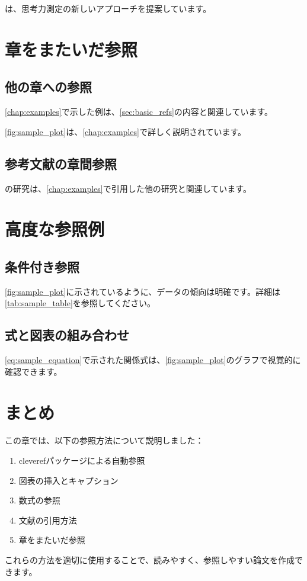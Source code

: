\documentclass[../main/main.tex]{subfiles}
\begin{document}
\parencite{arai2020japanese}は、思考力測定の新しいアプローチを提案しています。

\section{章をまたいだ参照}

\subsection{他の章への参照}

\cref{chap:examples}で示した例は、\cref{sec:basic_refs}の内容と関連しています。

\cref{fig:sample_plot}は、\cref{chap:examples}で詳しく説明されています。

\subsection{参考文献の章間参照}

\textcite{arai2020japanese}の研究は、\cref{chap:examples}で引用した他の研究\parencite{Black1998-yt}と関連しています。

\section{高度な参照例}

\subsection{条件付き参照}

\cref{fig:sample_plot}に示されているように、データの傾向は明確です。詳細は\cref{tab:sample_table}を参照してください。

\subsection{式と図表の組み合わせ}

\cref{eq:sample_equation}で示された関係式は、\cref{fig:sample_plot}のグラフで視覚的に確認できます。

\section{まとめ}

この章では、以下の参照方法について説明しました：

\begin{enumerate}
    \item cleverefパッケージによる自動参照
    \item 図表の挿入とキャプション
    \item 数式の参照
    \item 文献の引用方法
    \item 章をまたいだ参照
\end{enumerate}

これらの方法を適切に使用することで、読みやすく、参照しやすい論文を作成できます。
\end{document}
